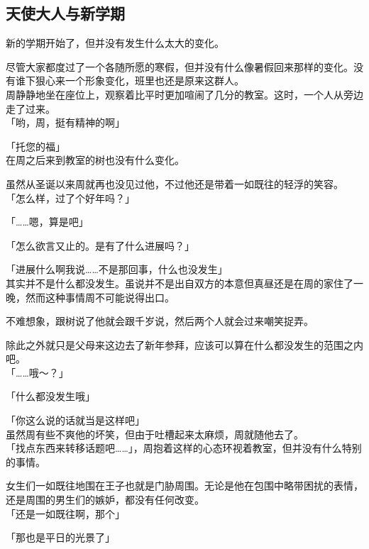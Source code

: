 \subsection{天使大人与新学期}

新的学期开始了，但并没有发生什么太大的变化。

尽管大家都度过了一个各随所愿的寒假，但并没有什么像暑假回来那样的变化。没有谁下狠心来一个形象变化，班里也还是原来这群人。\\

周静静地坐在座位上，观察着比平时更加喧闹了几分的教室。这时，一个人从旁边走了过来。\\

「哟，周，挺有精神的啊」

「托您的福」\\

在周之后来到教室的树也没有什么变化。

虽然从圣诞以来周就再也没见过他，不过他还是带着一如既往的轻浮的笑容。\\

「怎么样，过了个好年吗？」

「……嗯，算是吧」

「怎么欲言又止的。是有了什么进展吗？」

「进展什么啊我说……不是那回事，什么也没发生」\\

其实并不是什么都没发生。虽说并不是出自双方的本意但真昼还是在周的家住了一晚，然而这种事情周不可能说得出口。

不难想象，跟树说了他就会跟千岁说，然后两个人就会过来嘲笑捉弄。

除此之外就只是父母来这边去了新年参拜，应该可以算在什么都没发生的范围之内吧。\\

「……哦～？」

「什么都没发生哦」

「你这么说的话就当是这样吧」\\

虽然周有些不爽他的坏笑，但由于吐槽起来太麻烦，周就随他去了。\\

「找点东西来转移话题吧……」，周抱着这样的心态环视着教室，但并没有什么特别的事情。

女生们一如既往地围在王子也就是门胁周围。无论是他在包围中略带困扰的表情，还是周围的男生们的嫉妒，都没有任何改变。\\

「还是一如既往啊，那个」

「那也是平日的光景了」\\

